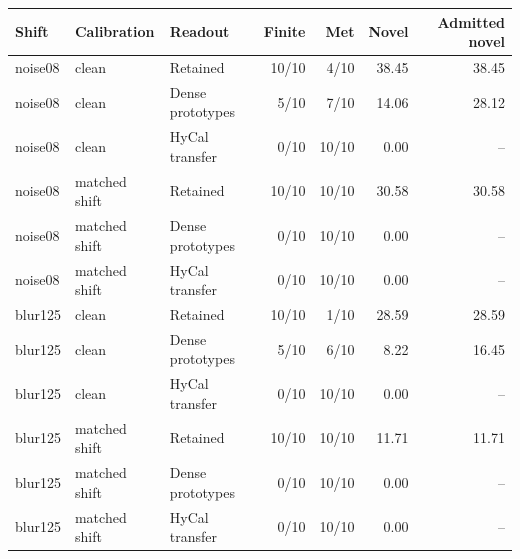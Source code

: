 \begin{tabular}{@{}lllrrrr@{}}
\toprule
Shift & Calibration & Readout & Finite & Met & Novel & Admitted novel \\
\midrule
noise08 & clean & Retained & 10/10 & 4/10 & 38.45 & 38.45 \\
noise08 & clean & Dense prototypes & 5/10 & 7/10 & 14.06 & 28.12 \\
noise08 & clean & HyCal transfer & 0/10 & 10/10 & 0.00 & -- \\
noise08 & matched shift & Retained & 10/10 & 10/10 & 30.58 & 30.58 \\
noise08 & matched shift & Dense prototypes & 0/10 & 10/10 & 0.00 & -- \\
noise08 & matched shift & HyCal transfer & 0/10 & 10/10 & 0.00 & -- \\
blur125 & clean & Retained & 10/10 & 1/10 & 28.59 & 28.59 \\
blur125 & clean & Dense prototypes & 5/10 & 6/10 & 8.22 & 16.45 \\
blur125 & clean & HyCal transfer & 0/10 & 10/10 & 0.00 & -- \\
blur125 & matched shift & Retained & 10/10 & 10/10 & 11.71 & 11.71 \\
blur125 & matched shift & Dense prototypes & 0/10 & 10/10 & 0.00 & -- \\
blur125 & matched shift & HyCal transfer & 0/10 & 10/10 & 0.00 & -- \\
\bottomrule
\end{tabular}
